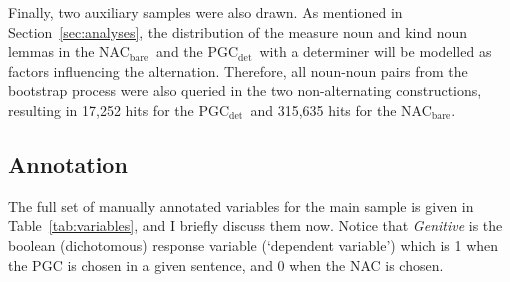 \documentclass[USenglish]{article}
\newcommand{\Sub}[1]{\ensuremath{\mathrm{_{#1}}}}
\newcommand{\NACb}{NAC\Sub{bare}}
\newcommand{\PGCd}{PGC\Sub{det}}
\begin{document}
Finally, two auxiliary samples were also drawn.
As mentioned in Section~\ref{sec:analyses}, the distribution of the measure noun and kind noun lemmas in the \NACb\ and the \PGCd\ with a determiner will be modelled as factors influencing the alternation.
Therefore, all noun-noun pairs from the bootstrap process were also queried in the two non-alternating constructions, resulting in 17,252 hits for the \PGCd\ and 315,635 hits for the \NACb.



\subsection{Annotation}
\label{sec:annotation}

The full set of manually annotated variables for the main sample is given in Table~\ref{tab:variables}, and I briefly discuss them now.
Notice that \textit{Genitive} is the boolean (dichotomous) response variable (`dependent variable') which is 1 when the PGC is chosen in a given sentence, and 0 when the NAC is chosen.
\end{document}
